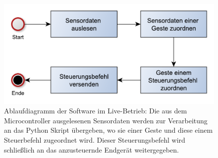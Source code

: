 \begin{figure}[h]
	\centering
	\includegraphics[scale=0.75]{../figures/AblaufSteuerung.pdf}
	\caption{Ablaufdiagramm der Software im Live-Betrieb: Die aus dem Microcontroller ausgelesenen Sensordaten werden zur Verarbeitung an das Python Skript übergeben, wo sie einer Geste und diese einem Steuerbefehl zugeordnet wird. Dieser Steuerungsbefehl wird schließlich an das anzusteuernde Endgerät weitergegeben.}
	\label{fig:AblaufSteuerung}
\end{figure}